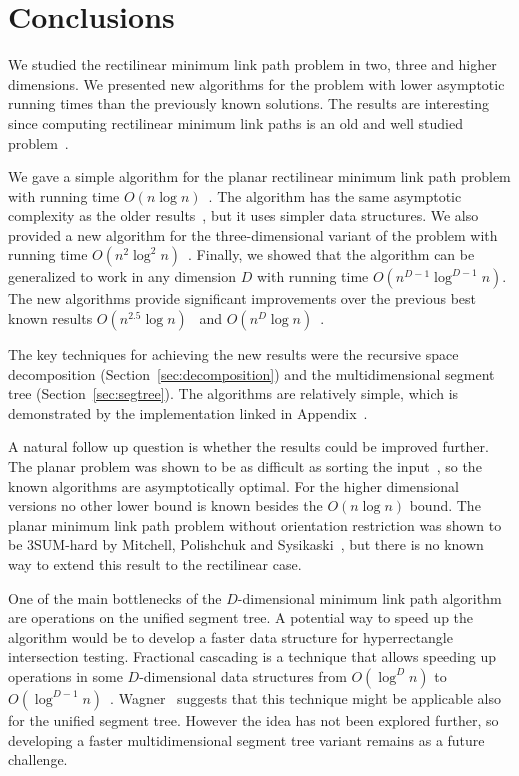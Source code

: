 \documentclass[english,gradu]{tktltiki2018}
\begin{document}
\section{Conclusions}\label{sec:conclusions}

We studied the rectilinear minimum link path problem in two, three and higher dimensions.
We presented new algorithms for the problem with lower asymptotic running times than the previously known solutions.
The results are interesting since computing rectilinear minimum link paths is an old and well studied problem~\cite{restricted,wagner}.

We gave a simple algorithm for the planar rectilinear minimum link path problem with running time $O(n\log n)$~\cite{revisited}.
The algorithm has the same asymptotic complexity as the older results~\cite{dasnar,sato}, but it uses simpler data structures.
We also provided a new algorithm for the three-dimensional variant of the problem with running time $O(n^2\log^2 n)$~\cite{restricted}.
Finally, we showed that the algorithm can be generalized to work in any dimension $D$ with running time $O(n^{D-1}\log^{D-1}n)$.
The new algorithms provide significant improvements over the previous best known results $O(n^{2.5}\log n)$~\cite{wagner} and $O(n^D\log n)$~\cite{de1992}.

The key techniques for achieving the new results were the recursive space decomposition (Section~\ref{sec:decomposition}) and the multidimensional segment tree (Section~\ref{sec:segtree}).
The algorithms are relatively simple, which is demonstrated by the implementation linked in Appendix~\apxsrc.

A natural follow up question is whether the results could be improved further.
The planar problem was shown to be as difficult as sorting the input~\cite{dasnar}, so the known algorithms are asymptotically optimal.
For the higher dimensional versions no other lower bound is known besides the $O(n\log n)$ bound.
The planar minimum link path problem without orientation restriction was shown to be 3SUM-hard by Mitchell, Polishchuk and Sysikaski~\cite{revisited}, but there is no known way to extend this result to the rectilinear case.

One of the main bottlenecks of the $D$-dimensional minimum link path algorithm are operations on the unified segment tree.
A potential way to speed up the algorithm would be to develop a faster data structure for hyperrectangle intersection testing.
Fractional cascading is a technique that allows speeding up operations in some $D$-dimensional data structures from $O(\log^D n)$ to $O(\log^{D-1} n)$~\cite{fractional,ortho}.
Wagner~\cite{unified} suggests that this technique might be applicable also for the unified segment tree.
However the idea has not been explored further, so developing a faster multidimensional segment tree variant remains as a future challenge.
\end{document}
